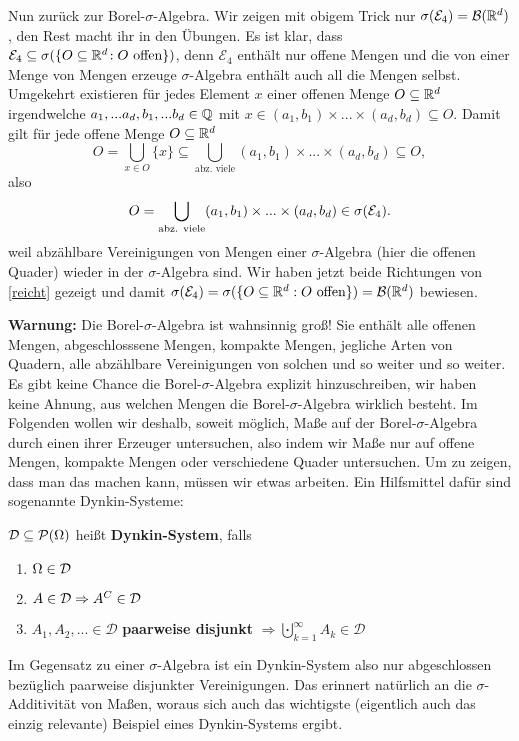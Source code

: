 	Nun zurück zur Borel-$\sigma$-Algebra. Wir zeigen mit obigem Trick nur $\sigma(\mathcal E_4)=\mathcal{B}(\mathbb{R}^d)$, den Rest macht ihr in den \"Ubungen. Es ist klar, dass $\mathcal E_4 \subseteq \sigma(\{ O\subseteq \mathbb{R}^d \! : O \text{ offen} \})$, denn $\mathcal E_4$ enth\"alt nur offene Mengen und die von einer Menge von Mengen erzeuge $\sigma$-Algebra enth\"alt auch all die Mengen selbst. Umgekehrt existieren für jedes Element $x$ einer offenen Menge $O\subseteq \mathbb{R}^d$ irgendwelche $a_1,...a_d,b_1,...b_d \in \mathbb{Q}$ mit $x \in (a_1,b_1)\times...\times(a_d,b_d)\subseteq O$. Damit gilt f\"ur jede offene Menge $O\subseteq \mathbb{R}^d$ \[ O=\bigcup_{x\in O}\{x\}\subseteq  \bigcup\limits_{\text{abz. viele}} (a_1,b_1)\times...\times(a_d,b_d) \subseteq O, \]
	also 
	\begin{align*}
		O=\bigcup\limits_{\text{abz. viele}} (a_1,b_1)\times...\times(a_d,b_d) \in \sigma (\mathcal{E}_4).
	\end{align*}
	weil abz\"ahlbare Vereinigungen von Mengen einer $\sigma$-Algebra (hier die offenen Quader) wieder in der $\sigma$-Algebra sind. Wir haben jetzt beide Richtungen von \eqref{reicht} gezeigt und damit $\sigma(\mathcal{E}_4)=\sigma(\{O\subseteq \mathbb{R}^d: O \text{ offen}\})=\mathcal B(\mathbb{R}^d)$ bewiesen.\smallskip
	
\textbf{Warnung:} Die Borel-$\sigma$-Algebra ist wahnsinnig gro\ss! Sie enth\"alt alle offenen Mengen, abgeschlosssene Mengen, kompakte Mengen, jegliche Arten von Quadern, alle abz\"ahlbare Vereinigungen von solchen und so weiter und so weiter. Es gibt keine Chance die Borel-$\sigma$-Algebra explizit hinzuschreiben, wir haben keine Ahnung, aus welchen Mengen die Borel-$\sigma$-Algebra wirklich besteht. Im Folgenden wollen wir deshalb, soweit m\"oglich, Ma\ss e auf der Borel-$\sigma$-Algebra durch einen ihrer Erzeuger untersuchen, also indem wir Ma\ss e nur auf offene Mengen, kompakte Mengen oder verschiedene Quader untersuchen. Um zu zeigen, dass man das machen kann, m\"ussen wir etwas arbeiten. Ein Hilfsmittel daf\"ur sind sogenannte Dynkin-Systeme:
\begin{deff} 
	$\mathcal{D} \subseteq \mathcal{P} (\Omega)$ heißt \textbf{Dynkin-System}, falls
	\begin{enumerate}[label=(\roman*)]
		\item $\Omega \in \mathcal{D}$
		\item $A \in \mathcal{D} \Rightarrow A^C \in \mathcal{D}$
		\item $A_{1},A_{2},... \in \mathcal{D}$ \textbf{paarweise disjunkt}  $\Rightarrow \bigcupdot\limits_{k=1}^{\infty}A_k \in \mathcal{D}$
	\end{enumerate}
	Im Gegensatz zu einer $\sigma$-Algebra ist ein Dynkin-System also nur abgeschlossen bez\"uglich paarweise disjunkter Vereinigungen. Das erinnert nat\"urlich an die $\sigma$-Additivit\"at von Ma\ss en, woraus sich auch das wichtigste (eigentlich auch das einzig relevante) Beispiel eines Dynkin-Systems ergibt.
	\end{deff}


